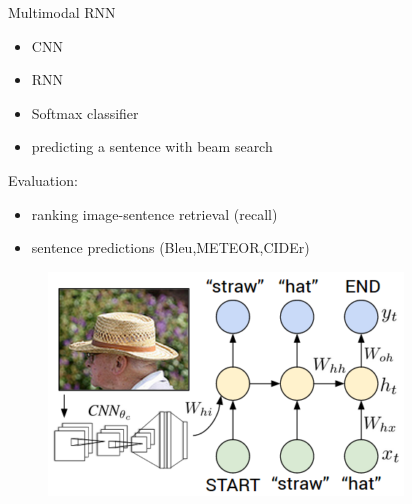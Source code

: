 \documentclass[16pt]{beamer}
\newenvironment{wideitemize}{\itemize\addtolength{\itemsep}{10pt}}{\enditemize}
\begin{document}
\begin{frame}{\cite{Karpathy2015}}
\begin{wideitemize}
\item Multimodal RNN %
\begin{itemize}
    \item CNN
    \item RNN
    \item Softmax classifier
    \item predicting a sentence with beam search
\end{itemize}
\item Evaluation: 
    \begin{itemize} 
    \item ranking image-sentence retrieval (recall)
    \item sentence predictions (Bleu,METEOR,CIDEr)
    \end{itemize}
\begin{figure}[tb]
           \centering
           \includegraphics[scale=0.6]{karpathy.PNG}
\end{figure} %


\end{wideitemize}
\end{frame}
\end{document}
